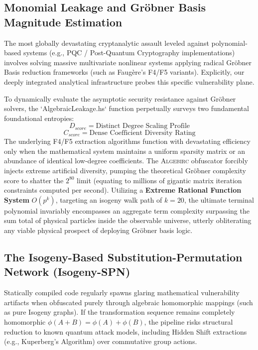 \subsection{Monomial Leakage and Gröbner Basis Magnitude Estimation}
The most globally devastating cryptanalytic assault leveled against polynomial-based systems (e.g., PQC / Post-Quantum Cryptography implementations) involves solving massive multivariate nonlinear systems applying radical Gröbner Basis reduction frameworks (such as Faugère's F4/F5 variants). Explicitly, our deeply integrated analytical infrastructure probes this specific vulnerability plane.

To dynamically evaluate the asymptotic security resistance against Gröbner solvers, the `AlgebraicLeakage.hs` function perpetually surveys two fundamental foundational entropies:
\begin{equation}
    D_{score} = \text{Distinct Degree Scaling Profile}
\end{equation}
\begin{equation}
    C_{score} = \text{Dense Coefficient Diversity Rating}
\end{equation}
The underlying F4/F5 extraction algorithms function with devastating efficiency only when the mathematical system maintains a uniform sparsity matrix or an abundance of identical low-degree coefficients. The \textsc{Algebirc} obfuscator forcibly injects extreme artificial diversity, pumping the theoretical Gröbner complexity score to shatter the $2^{80}$ limit (equating to millions of gigantic matrix iteration constraints computed per second). Utilizing a \textbf{Extreme Rational Function System} $O(p^k)$, targeting an isogeny walk path of $k=20$, the ultimate terminal polynomial invariably encompasses an aggregate term complexity surpassing the sum total of physical particles inside the observable universe, utterly obliterating any viable physical prospect of deploying Gröbner basis logic.

\subsection{The Isogeny-Based Substitution-Permutation Network (Isogeny-SPN)}
Statically compiled code regularly spawns glaring mathematical vulnerability artifacts when obfuscated purely through algebraic homomorphic mappings (such as pure Isogeny graphs). If the transformation sequence remains completely homomorphic $\phi(A+B) = \phi(A) + \phi(B)$, the pipeline risks structural reduction to known quantum attack models, including Hidden Shift extractions (e.g., Kuperberg's Algorithm) over commutative group actions.

